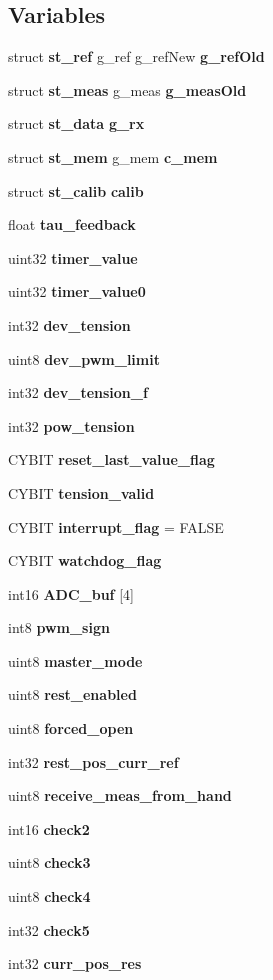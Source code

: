 \subsection*{Variables}
\begin{DoxyCompactItemize}
\item 
struct \textbf{ st\+\_\+ref} g\+\_\+ref g\+\_\+ref\+New \textbf{ g\+\_\+ref\+Old}
\item 
struct \textbf{ st\+\_\+meas} g\+\_\+meas \textbf{ g\+\_\+meas\+Old}
\item 
struct \textbf{ st\+\_\+data} \textbf{ g\+\_\+rx}
\item 
struct \textbf{ st\+\_\+mem} g\+\_\+mem \textbf{ c\+\_\+mem}
\item 
\mbox{\label{globals_8c_aed96fdd8308fe2c4fc07c3b5db1c7bbb}} 
struct \textbf{ st\+\_\+calib} {\bfseries calib}
\item 
float \textbf{ tau\+\_\+feedback}
\item 
uint32 \textbf{ timer\+\_\+value}
\item 
uint32 \textbf{ timer\+\_\+value0}
\item 
int32 \textbf{ dev\+\_\+tension}
\item 
uint8 \textbf{ dev\+\_\+pwm\+\_\+limit}
\item 
int32 \textbf{ dev\+\_\+tension\+\_\+f}
\item 
int32 \textbf{ pow\+\_\+tension}
\item 
C\+Y\+B\+IT \textbf{ reset\+\_\+last\+\_\+value\+\_\+flag}
\item 
C\+Y\+B\+IT \textbf{ tension\+\_\+valid}
\item 
C\+Y\+B\+IT \textbf{ interrupt\+\_\+flag} = F\+A\+L\+SE
\item 
C\+Y\+B\+IT \textbf{ watchdog\+\_\+flag}
\item 
\mbox{\label{globals_8c_abb22f0a4462a0b4db27496654f2175a0}} 
int16 {\bfseries A\+D\+C\+\_\+buf} [4]
\item 
int8 \textbf{ pwm\+\_\+sign}
\item 
uint8 \textbf{ master\+\_\+mode}
\item 
uint8 \textbf{ rest\+\_\+enabled}
\item 
uint8 \textbf{ forced\+\_\+open}
\item 
int32 \textbf{ rest\+\_\+pos\+\_\+curr\+\_\+ref}
\item 
uint8 \textbf{ receive\+\_\+meas\+\_\+from\+\_\+hand}
\item 
\mbox{\label{globals_8c_ab43d57397f71cb35c19d91058c48bed2}} 
int16 {\bfseries check2}
\item 
\mbox{\label{globals_8c_a07ae6981551bcb1232593903a0cec1be}} 
uint8 {\bfseries check3}
\item 
\mbox{\label{globals_8c_a57815d5e67537f44e37f31deb0cca84e}} 
uint8 {\bfseries check4}
\item 
\mbox{\label{globals_8c_a3e70f7fe645db3f664a6a47e63af6bff}} 
int32 {\bfseries check5}
\item 
\mbox{\label{globals_8c_ab2b7ed40fdef23f9dad3b7351df3b8f4}} 
int32 {\bfseries curr\+\_\+pos\+\_\+res}
\end{DoxyCompactItemize}


